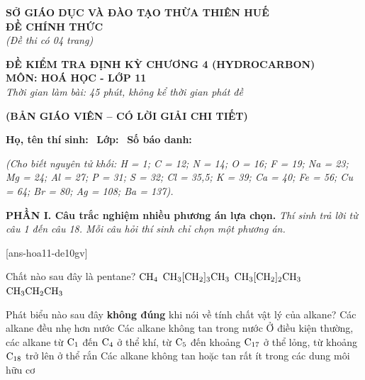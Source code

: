 \documentclass[12pt,a4paper]{article}
\begin{document}
\thispagestyle{firstpage}

\noindent
\begin{minipage}[t]{0.44\textwidth}
	\centering\fontsize{10pt}{12pt}\selectfont
	\textbf{SỞ GIÁO DỤC VÀ ĐÀO TẠO THỪA THIÊN HUẾ}\\
	\textbf{ĐỀ CHÍNH THỨC}\\
	\textit{(Đề thi có 04 trang)}
\end{minipage}\hfill
\begin{minipage}[t]{0.54\textwidth}
	\centering\fontsize{10.5pt}{13pt}\selectfont
	\textbf{ĐỀ KIỂM TRA ĐỊNH KỲ CHƯƠNG 4 (HYDROCARBON)}\\
	\textbf{MÔN: HOÁ HỌC - LỚP 11}\\
	\textit{Thời gian làm bài: 45 phút, không kể thời gian phát đề}
	
	\smallskip
\end{minipage}

\smallskip
\begin{center}
	{\color{hfRed}\textbf{\large (BẢN GIÁO VIÊN -- CÓ LỜI GIẢI CHI TIẾT)}}
\end{center}

\smallskip
\noindent\hrulefill
\smallskip

\noindent\textbf{Họ, tên thí sinh:} \dotfill\ \textbf{Lớp:} \dotfill\ \textbf{Số báo danh:} \dotfill

\smallskip
\noindent\textit{(Cho biết nguyên tử khối: H = 1; C = 12; N = 14; O = 16; F = 19; Na = 23; Mg = 24; Al = 27; P = 31; S = 32; Cl = 35,5; K = 39; Ca = 40; Fe = 56; Cu = 64; Br = 80; Ag = 108; Ba = 137).}
\smallskip

\noindent\textbf{\large PHẦN I. Câu trắc nghiệm nhiều phương án lựa chọn.}
\textit{Thí sinh trả lời từ câu 1 đến câu 18. Mỗi câu hỏi thí sinh chỉ chọn một phương án.}
\vspace{0.2cm}

[ans-hoa11-de10gv]

\begin{ex}
Chất nào sau đây là pentane?
\choice
{$\ce{CH4}$}
{\True $\ce{CH3[CH2]3CH3}$}
{$\ce{CH3[CH2]2CH3}$}
{$\ce{CH3CH2CH3}$}
\end{ex}

\begin{ex}
Phát biểu nào sau đây \textbf{không đúng} khi nói về tính chất vật lý của alkane?
\choice
{Các alkane đều nhẹ hơn nước}
{Các alkane không tan trong nước}
{Ở điều kiện thường, các alkane từ $\ce{C1}$ đến $\ce{C4}$ ở thể khí, từ $\ce{C5}$ đến khoảng $\ce{C17}$ ở thể lỏng, từ khoảng $\ce{C18}$ trở lên ở thể rắn}
{\True Các alkane không tan hoặc tan rất ít trong các dung môi hữu cơ}
\end{ex}
\end{document}
